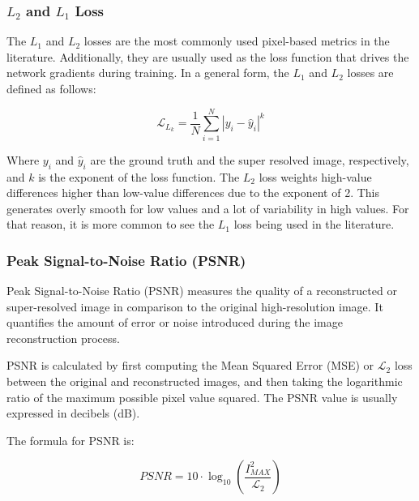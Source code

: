         \subsubsection{$L_2$ and $L_1$ Loss}

            The $L_1$ and $L_2$ losses are the most commonly used pixel-based metrics in the literature. 
            Additionally, they are usually used as the loss function that drives the network gradients during training.
            In a general form, the $L_1$ and $L_2$ losses are defined as follows:

            \begin{equation}
                \mathcal{L}_{L_k} = \frac{1}{N} \sum_{i=1}^{N} |y_i - \hat{y}_i|^k
            \end{equation}

            Where $y_i$ and $\hat{y}_i$ are the ground truth and the super resolved image, respectively, and $k$ is the exponent of the loss function. 
            The $L_2$ loss weights high-value differences higher than low-value differences due to the exponent of 2. 
            This generates overly smooth for low values and a lot of variability in high values. 
            For that reason, it is more common to see the $L_1$ loss being used in the literature.

        \subsubsection{Peak Signal-to-Noise Ratio (PSNR)}

         
            Peak Signal-to-Noise Ratio (PSNR) measures the quality of a reconstructed or super-resolved image in comparison to the original high-resolution image. It quantifies the amount of error or noise introduced during the image reconstruction process.
            
            PSNR is calculated by first computing the Mean Squared Error (MSE) or $\mathcal{L}_2$ loss between the original and reconstructed images, and then taking the logarithmic ratio of the maximum possible pixel value squared. The PSNR value is usually expressed in decibels (dB).
            
            The formula for PSNR is:
            
            \begin{equation}
            PSNR = 10 \cdot \log_{10} \left( \frac{I_{MAX}^{2}}{\mathcal{L}_2} \right)
            \end{equation}
            
